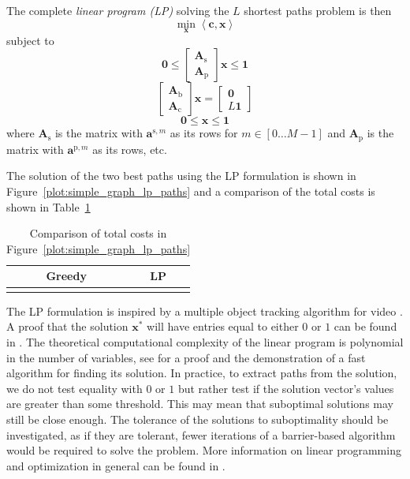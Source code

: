 The complete \textit{linear program (LP)} solving the $L$ shortest paths problem is then
\[
    \min_{\boldsymbol{x}} \left\langle \boldsymbol{c}, \boldsymbol{x} \right\rangle
\]
subject to
\[
    \boldsymbol{0} \leq
    \begin{bmatrix}
        \boldsymbol{A}_{\text{s}} \\
        \boldsymbol{A}_{\text{p}}
    \end{bmatrix} \boldsymbol{x}
    \leq \boldsymbol{1}
\]
\[
    \begin{bmatrix}
        \boldsymbol{A}_{\text{b}} \\
        \boldsymbol{A}_{\text{c}}
    \end{bmatrix}
    \boldsymbol{x}
    =
    \begin{bmatrix}
        \boldsymbol{0} \\
        L\boldsymbol{1}
    \end{bmatrix}
\]
\[
    \boldsymbol{0} \leq \boldsymbol{x} \leq \boldsymbol{1}
\]
where $\boldsymbol{A}_{\text{s}}$ is the matrix with
$\boldsymbol{a}^{\text{s},m}$ as its rows for $m \in [0 \dotsc M-1]$ and
$\boldsymbol{A}_{\text{p}}$ is the matrix with $\boldsymbol{a}^{\text{p},m}$ as
its rows, etc.

The solution of the two best paths using the LP formulation
is shown in Figure~\ref{plot:simple_graph_lp_paths} and a comparison of the
total costs is shown in Table~\ref{tab:greedy_lp_cost_compare}

\begin{table}[!b]
    \caption{\label{tab:greedy_lp_cost_compare} Comparison of total costs in
    Figure~\ref{plot:simple_graph_lp_paths}}
    \begin{center}
        \begin{tabular}{c c}
            Greedy & LP \\
            \hline
             &
             \\
        \end{tabular}
    \end{center}
\end{table}

The LP formulation is inspired by a multiple object tracking algorithm for video
\cite{jiang2007linear}. A proof that the solution $\boldsymbol{x}^{\ast}$ will
have entries equal to either $0$ or $1$ can be found in
\cite[p.~167]{parker1988discrete}. The theoretical computational complexity of
the linear program is polynomial in the number of variables, see
\cite{karmarkar1984new} for a proof and the demonstration of a fast algorithm
for finding its solution. In practice, to extract paths from the solution, we do
not test equality with $0$ or $1$ but rather test if the solution vector's
values are greater than some threshold. This may mean that suboptimal solutions
may still be close enough. The tolerance of the solutions to suboptimality
should be investigated, as if they are tolerant, fewer iterations of a
barrier-based algorithm would be required to solve the problem. More information
on linear programming and optimization in general can be found in
\cite{boyd2004convex}.

